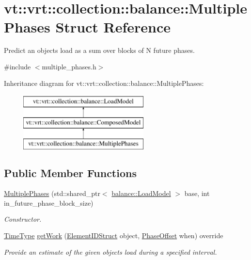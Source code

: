 \hypertarget{structvt_1_1vrt_1_1collection_1_1balance_1_1_multiple_phases}{}\section{vt\+:\+:vrt\+:\+:collection\+:\+:balance\+:\+:Multiple\+Phases Struct Reference}
\label{structvt_1_1vrt_1_1collection_1_1balance_1_1_multiple_phases}


Predict an object\textquotesingle{}s load as a sum over blocks of N future phases.  




{\ttfamily \#include $<$multiple\+\_\+phases.\+h$>$}

Inheritance diagram for vt\+:\+:vrt\+:\+:collection\+:\+:balance\+:\+:Multiple\+Phases\+:\begin{figure}[H]
\begin{center}
\leavevmode
\includegraphics[height=3.000000cm]{structvt_1_1vrt_1_1collection_1_1balance_1_1_multiple_phases}
\end{center}
\end{figure}
\subsection*{Public Member Functions}
\begin{DoxyCompactItemize}
\item 
\hyperlink{structvt_1_1vrt_1_1collection_1_1balance_1_1_multiple_phases_a28aba5fe005d35319e34ca8406aca936}{Multiple\+Phases} (std\+::shared\+\_\+ptr$<$ \hyperlink{structvt_1_1vrt_1_1collection_1_1balance_1_1_load_model}{balance\+::\+Load\+Model} $>$ base, int in\+\_\+future\+\_\+phase\+\_\+block\+\_\+size)
\begin{DoxyCompactList}\small\item\em Constructor. \end{DoxyCompactList}\item 
\hyperlink{namespacevt_a876a9d0cd5a952859c72de8a46881442}{Time\+Type} \hyperlink{structvt_1_1vrt_1_1collection_1_1balance_1_1_multiple_phases_aebe7b174623cffe8f4790e32e15859ff}{get\+Work} (\hyperlink{namespacevt_1_1vrt_1_1collection_1_1balance_a9f5b53fafb270212279a4757d2c4cd28}{Element\+I\+D\+Struct} object, \hyperlink{structvt_1_1vrt_1_1collection_1_1balance_1_1_phase_offset}{Phase\+Offset} when) override
\begin{DoxyCompactList}\small\item\em Provide an estimate of the given object\textquotesingle{}s load during a specified interval. \end{DoxyCompactList}\end{DoxyCompactItemize}
